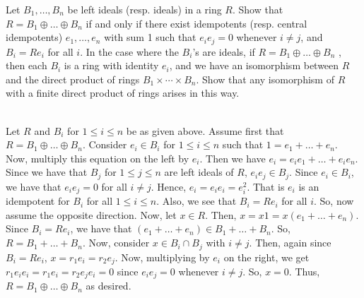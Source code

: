 Let $B_1,\ldots, B_n$ be left ideals (resp. ideals) in a ring $R$. Show that
$R=B_1\oplus\ldots\oplus B_n$ if and only if there exist idempotents (resp. central idempotents)
$e_1,\ldots, e_n$ with sum 1 such that $e_ie_j = 0$ whenever $i\neq j$, and $B_i=Re_i$ for all $i$. In
the case where the $B_i$'s are ideals, if $R=B_1\oplus\ldots\oplus B_n$ , then each $B_i$ is a ring with
identity $e_i$, and we have an isomorphism between $R$ and the direct product of rings
$B_1\times\cdots\times B_n$. Show that any isomorphism of $R$ with a finite direct product of rings
arises in this way.\\

\begin{solution}\renewcommand{\qedsymbol}{}\ \\
    Let $R$ and $B_i$ for $1\leq i\leq n$ be as given above. Assume first that
    $R=B_1\oplus\ldots\oplus B_n$. Consider $e_i\in B_i$ for $1\leq i\leq n$ such that
    $1=e_1+\ldots+e_n$. Now, multiply this equation on the left by $e_i$. Then we have
    $e_i=e_ie_1+\ldots+e_ie_n$. Since we have that $B_j$ for $1\leq j\leq n$ are left ideals of
    $R$, $e_ie_j\in B_j$. Since $e_i\in B_i$, we have that $e_ie_j=0$ for all $i\neq j$. Hence,
    $e_i=e_ie_i=e_i^2$. That is $e_i$ is an idempotent for $B_i$ for all $1\leq i\leq n$. Also, we see
    that $B_i=Re_i$ for all $i$. So, now assume the opposite direction. Now, let $x\in R$. Then,
    $x=x1=x(e_1+\ldots+e_n)$. Since $B_i=Re_i$, we have that $(e_1+\ldots+e_n)\in B_1+\ldots+B_n$. So,
    $R=B_1+\ldots+B_n$. Now, consider $x\in B_i\cap B_j$ with $i\neq j$. Then, again since $B_i=Re_i$,
    $x=r_1e_i=r_2e_j$. Now, multiplying by $e_i$ on the right, we get $r_1e_ie_i=r_1e_i=r_2e_je_i=0$
    since $e_ie_j=0$ whenever $i\neq j$. So, $x=0$. Thus, $R=B_1\oplus\ldots\oplus B_n$ as desired.

\end{solution}